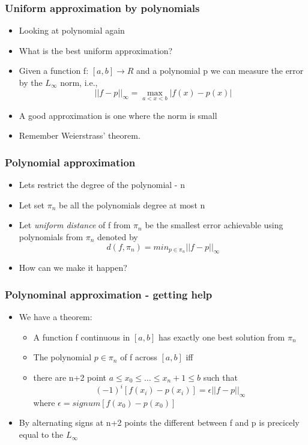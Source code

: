 \documentclass[10pt]{beamer}
\begin{document}
\begin{frame}
  \frametitle{Uniform approximation by polynomials}
  \begin{itemize}
  \item Looking at polynomial again
  \item What is the best uniform approximation? 
  \item Given a function f: $[a,b] \rightarrow R$ and a polynomial p we can measure the error by the $L_{\infty}$ norm, i.e.,
    \[
      ||f-p||_{\infty} = \max_{a<x<b} | f(x) - p(x) |
    \]
  \item A good approximation is one where the norm is small
  \item Remember Weierstrass' theorem. 
  \end{itemize}
\end{frame}

\begin{frame}
  \frametitle{Polynomial approximation}
  \begin{itemize}
  \item Lets restrict the degree of the polynomial - n
  \item Let set $\pi_n$ be all the polynomials degree at most n
  \item Let {\em uniform distance} of f from $\pi_n$ be the smallest
    error achievable using polynomials from $\pi_n$ denoted by
    \[
      d(f,\pi_n) = min_{p\in \pi_n} ||f - p ||_{\infty}
    \]
    
  \item How can we make it happen? 
  \end{itemize}
\end{frame}

\begin{frame}
  \frametitle{Polynominal approximation - getting help}
  \begin{itemize}
  \item We have a theorem:
    \begin{itemize}
    \item A function f continuous in $[a,b]$ has exactly one best
      solution from $\pi_n$
    \item The polynomial $p \in \pi_n$ of f across $[a,b]$ iff
    \item there are n+2 point $a \leq x_0 \leq \ldots \leq x_n+1 \leq b$ such that
      \[
        (-1)^i [ f(x_i) - p(x_i) ] = \epsilon ||f-p||_{\infty}
      \]
      where $\epsilon = signum[f(x_0)-p(x_0)]$ 
    \end{itemize}
  \item By alternating signs at n+2 points the different between f and p is precicely equal to the $L_{\infty}$
  \end{itemize}
\end{frame}
\end{document}
